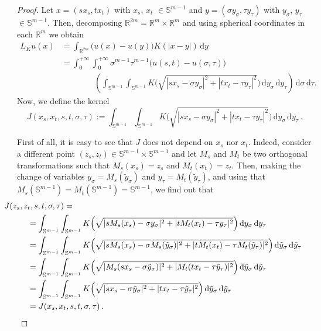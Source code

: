 \documentclass[12pt,reqno]{amsart}
\theoremstyle{definition}
\theoremstyle{remark}
\newcommand{\con}[1]{\mathbb{#1}}
\newcommand{\R}{\con{R}} %
\newcommand{\Sph}{\con{S}} %
\renewcommand{\d}{\,\mathrm{d}} %
\newcommand{\bpar}[1]{\left ( {#1}\right )}
\numberwithin{equation}{section}
\begin{document}
	
	\begin{proof}
		Let $x = (s x_s, t x_t)$ with $x_s$, $x_t$ $\in \Sph^{m-1}$ and $y = (\sigma y_\sigma, \tau
		y_\tau)$ with $y_\sigma$, $y_\tau$ $\in \Sph^{m-1}$. Then, decomposing $\R^{2m} = \R^m \times \R^m$
		and using spherical coordinates in each $\R^m$ we obtain
		\begin{align*}
		L_Ku(x) &= \int_{\R^{2m}} \big( u(x) - u(y)\big) K( |x-y|) \d y &\\
		&= \int_0^{+\infty}  \int_0^{+\infty} \sigma^{m-1} \tau^{m-1} \big(u(s,t) - u(\sigma, \tau)\big)  \\
		&\quad \quad \quad \quad  \bpar{\int_{\Sph^{m-1}}  \int_{\Sph^{m-1}} K \Big( \sqrt{|sx_s - \sigma y_\sigma|^2 + |t x_t - \tau y_\tau|^2 } \Big) \d y_\sigma \d y_\tau } \d \sigma \d \tau .
		\end{align*}
		Now, we define the kernel
		\begin{equation}
		\label{Eq:KernelSTVariablesProof1}
		J(x_s, x_t, s,t,\sigma, \tau) := \int_{\Sph^{m-1}}  \int_{\Sph^{m-1}} K \Big( \sqrt{|sx_s - \sigma y_\sigma|^2 + |t x_t - \tau y_\tau|^2 }\Big ) \d y_\sigma \d y_\tau \,.
		\end{equation}
		
		First of all, it is easy to see that $J$ does not depend on $x_s$ nor $x_t$. Indeed, consider a different point $(z_s, z_t)\in \Sph^{m-1} \times \Sph^{m-1}$ and let $M_s$ and $M_t$ be two orthogonal transformations such that $M_s(x_s) = z_s$ and $M_t(x_t) = z_t$. Then, making the change of variables $y_\sigma = M_s(\tilde{y}_\sigma)$ and $y_\tau = M_t(\tilde{y}_\tau)$, and using that $M_s( \Sph^{m-1}) = M_t(\Sph^{m-1}) = \Sph^{m-1}$, we find out that
		\begin{align*}
		& \hspace{-1cm} J(z_s, z_t, s,t,\sigma, \tau) = \\
		&= \int_{\Sph^{m-1}}  \int_{\Sph^{m-1}} K \Big( \sqrt{|s M_s(x_s) - \sigma y_\sigma|^2 + |t M_t(x_t) - \tau y_\tau|^2 }\Big) \d y_\sigma \d y_\tau \\
		&= \int_{\Sph^{m-1}}  \int_{\Sph^{m-1}} K \Big( \sqrt{|s M_s(x_s) - \sigma M_s(\tilde{y}_\sigma)|^2 + |t M_t(x_t) - \tau M_t(\tilde{y}_\tau)|^2 }\Big) \d \tilde{y}_\sigma \d \tilde{y}_\tau \\
		&= \int_{\Sph^{m-1}}  \int_{\Sph^{m-1}} K\Big ( \sqrt{|M_s(sx_s - \sigma \tilde{y}_\sigma)|^2 + |M_t(t x_t - \tau \tilde{y}_\tau)|^2 }\Big) \d \tilde{y}_\sigma \d \tilde{y}_\tau \\
		&= \int_{\Sph^{m-1}}  \int_{\Sph^{m-1}} K\Big ( \sqrt{|sx_s - \sigma \tilde{y}_\sigma|^2 + |t x_t - \tau \tilde{y}_\tau|^2 }\Big) \d \tilde{y}_\sigma \d \tilde{y}_\tau \\
		&= J(x_s, x_t, s,t,\sigma, \tau) \,.
		\end{align*}
		

\end{proof}
\end{document}
